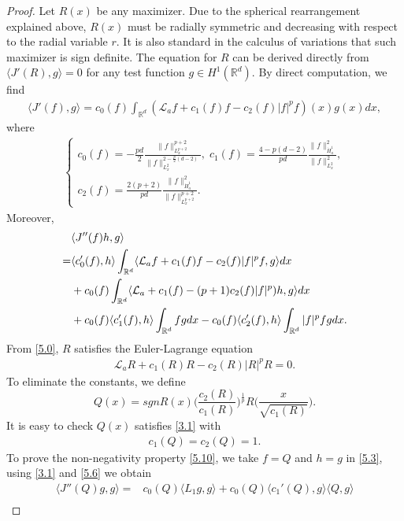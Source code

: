 \documentclass[12pt]{amsart}
\newcommand{\R}{\mathbb R}
\newcommand{\dha}{\dot H^1_a}
\newcommand{\la}{\mathcal L_a}
\begin{document}
\begin{proof}
Let $R(x)$ be any maximizer. Due to the spherical rearrangement explained above, $R(x)$ must be radially symmetric and decreasing with respect to the radial variable $r$. It is also standard in the calculus of variations that such maximizer is sign definite. The equation for $R$ can be derived directly from $\langle J'(R), g\rangle=0$ for any test function $g \in H^1 (\R^d)$. By direct computation, we find 
\begin{align}\label{5.0}
\langle J'(f), g\rangle =c_0(f)\int_{\R^d}(\la f+c_1(f)f-c_2(f)|f|^pf)(x) g(x) dx, 
\end{align}
where 
\begin{align}\label{5.2}
\begin{cases}
c_0(f)=-\tfrac{pd}2\tfrac{\|f\|_{L_x^{p+2}}^{p+2}}{\|f\|_{L_x^2}^{2-\frac p2(d-2)}}, \; 
c_1(f)=\frac{4-p(d-2)}{pd}\tfrac{\|f\|_{\dha}^2}{\|f\|_{L_x^2}^2},\\
c_2(f)=\frac{2(p+2)}{pd}\frac{\|f\|_{\dha}^2}{\|f\|_{L_x^{p+2}}^{p+2}}. 
\end{cases}
\end{align}
Moreover, 
\begin{align}\label{5.3}
&\langle J''(f)h, g\rangle \\
=&\langle c_0'(f), h\rangle \int_{\R^d}\langle \la f+c_1(f)f-c_2(f)|f|^pf,  g\rangle dx \notag \\
&+ c_0(f)\int_{\R^d}\langle \la+c_1(f)-(p+1)c_2(f)|f|^p)h, g\rangle dx\notag\\
&+c_0(f)\langle c_1'(f), h\rangle \int_{\R^d} fg dx-c_0(f)\langle c_2'(f), h\rangle \int_{\R^d}|f|^pf gdx. \notag
\end{align}
From \eqref{5.0}, $R$ satisfies the Euler-Lagrange equation
\begin{align}\label{6.1}
 \la R+c_1(R)R-c_2(R) |R|^{p}R=0.
 \end{align}
To eliminate the constants, we define
 \[
 Q(x)=sgn R(x)\Big(\frac{c_2(R)}{c_1(R)}\Big)^{\frac 1p}R\Big(\frac x{\sqrt{c_1(R)}} \Big).
 \]
 It is easy to check $Q(x)$ satisfies \eqref{3.1} with
 \begin{align}\label{5.6}
 c_1( Q)=c_2(Q)=1. 
 \end{align}
To prove the non-negativity property \eqref{5.10}, we take $f= Q$ and $h=g$ in \eqref{5.3}, using \eqref{3.1} and \eqref{5.6} we obtain 
 \begin{equation}\label{5.7} \begin{split}
 \langle J''( Q)g, g\rangle=&c_0( Q)\langle L_1 g, g\rangle +c_0( Q)\langle c_1'( Q), g\rangle \langle Q, g\rangle\\

\end{split}
\end{equation}
\end{proof}
\end{document}
